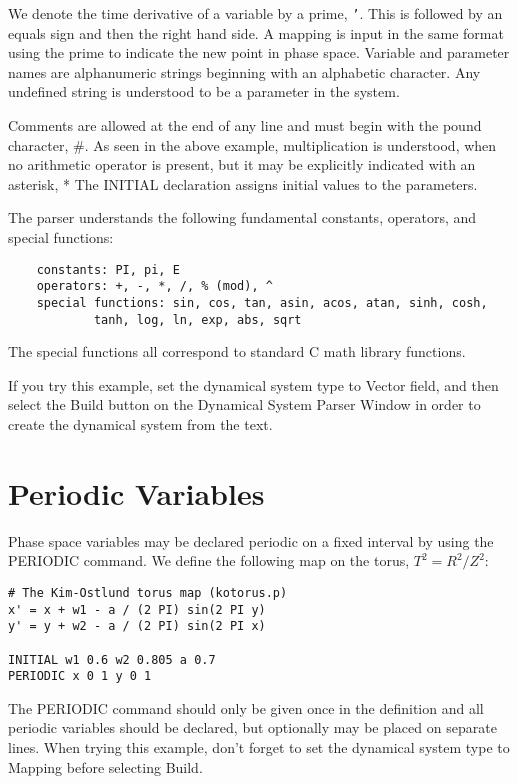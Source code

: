 We denote the time derivative of a variable by a prime, {\tt '}.  This is followed by
an equals sign and then the right hand side.  A mapping is input in the
same format using the prime to indicate the new point in phase space.
Variable and parameter names are alphanumeric strings beginning with an 
alphabetic character.
Any undefined string is understood to be a parameter in the system.   

Comments are allowed at the end of any line and must
begin with the pound character, \#.
As seen in the above example, multiplication is understood,
when no arithmetic operator is present, but it may be
explicitly indicated with an asterisk, *
The INITIAL declaration assigns initial values to the parameters.

The parser understands the following fundamental constants, operators, and
special functions:

\begin{verbatim}
	constants: PI, pi, E
	operators: +, -, *, /, % (mod), ^
	special functions: sin, cos, tan, asin, acos, atan, sinh, cosh, 
	        tanh, log, ln, exp, abs, sqrt
\end{verbatim}
The special functions all correspond to standard C math library functions.

If you try this example, set the dynamical system type to Vector field, and 
then select the Build button on the Dynamical System Parser Window in order to 
create the dynamical system from the text.


\section{Periodic Variables}

Phase space variables may be declared periodic on a fixed interval
by using the PERIODIC command.  We define the following map on the
torus, $T^2=R^2/Z^2$:

\begin{verbatim}
# The Kim-Ostlund torus map (kotorus.p)
x' = x + w1 - a / (2 PI) sin(2 PI y)
y' = y + w2 - a / (2 PI) sin(2 PI x)

INITIAL w1 0.6 w2 0.805 a 0.7
PERIODIC x 0 1 y 0 1
\end{verbatim}

The PERIODIC command should only be given once in the definition
and all periodic variables should be declared, but optionally may be placed
on separate lines.  
When trying this example, don't forget to set the dynamical system type
to Mapping before selecting Build.


